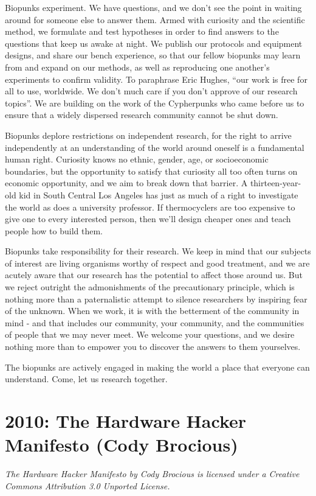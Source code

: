 \documentclass[letterpaper,12pt,english]{sphinxmanual}
\begin{document}
Biopunks experiment. We have questions, and we don't see the point in waiting around for someone else to answer them. Armed with curiosity and the scientific method, we formulate and test hypotheses in order to find answers to the questions that keep us awake at night. We publish our protocols and equipment designs, and share our bench experience, so that our fellow biopunks may learn from and expand on our methods, as well as reproducing one another's experiments to confirm validity. To paraphrase Eric Hughes, ``our work is free for all to use, worldwide. We don't much care if you don't approve of our research topics''. We are building on the work of the Cypherpunks who came before us to ensure that a widely dispersed research community cannot be shut down.

Biopunks deplore restrictions on independent research, for the right to arrive independently at an understanding of the world around oneself is a fundamental human right. Curiosity knows no ethnic, gender, age, or socioeconomic boundaries, but the opportunity to satisfy that curiosity all too often turns on economic opportunity, and we aim to break down that barrier. A thirteen-year-old kid in South Central Los Angeles has just as much of a right to investigate the world as does a university professor. If thermocyclers are too expensive to give one to every interested person, then we'll design cheaper ones and teach people how to build them.

Biopunks take responsibility for their research. We keep in mind that our subjects of interest are living organisms worthy of respect and good treatment, and we are acutely aware that our research has the potential to affect those around us. But we reject outright the admonishments of the precautionary principle, which is nothing more than a paternalistic attempt to silence researchers by inspiring fear of the unknown. When we work, it is with the betterment of the community in mind - and that includes our community, your community, and the communities of people that we may never meet. We welcome your questions, and we desire nothing more than to empower you to discover the answers to them yourselves.

The biopunks are actively engaged in making the world a place that everyone can understand. Come, let us research together.


\chapter{2010: The Hardware Hacker Manifesto (Cody Brocious)}
\label{hardware-hacker::doc}\label{hardware-hacker:the-hardware-hacker-manifesto-cody-brocious}\label{hardware-hacker:index-0}
\emph{The Hardware Hacker Manifesto by Cody Brocious is licensed under a Creative Commons Attribution 3.0 Unported License.}
\end{document}
